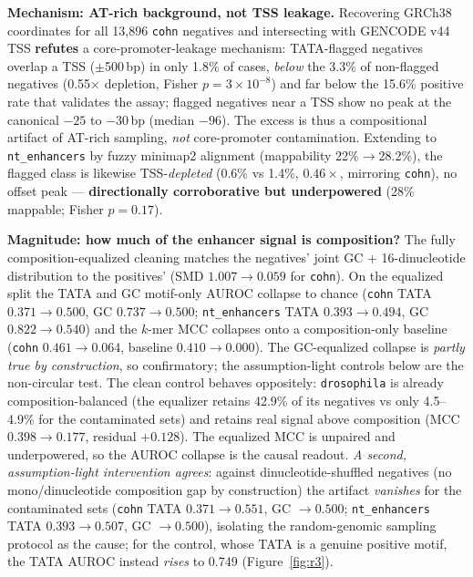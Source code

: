 \documentclass{ws-procs11x85}
\begin{document}
\textbf{Mechanism: AT-rich background, not TSS leakage.} Recovering GRCh38 coordinates for all
13{,}896 \texttt{cohn} negatives and intersecting with GENCODE v44 TSS \textbf{refutes} a
core-promoter-leakage mechanism: TATA-flagged negatives overlap a TSS ($\pm$500\,bp) in only 1.8\% of
cases, \emph{below} the 3.3\% of non-flagged negatives (0.55$\times$ depletion, Fisher
$p{=}3{\times}10^{-8}$) and far below the 15.6\% positive rate that validates the assay; flagged negatives
near a TSS show no peak at the canonical $-25$ to $-30$\,bp (median $-96$). The excess is thus a
compositional artifact of AT-rich sampling, \emph{not} core-promoter contamination. Extending to
\texttt{nt\_enhancers} by fuzzy minimap2 alignment (mappability 22\%$\to$28.2\%), the flagged class is
likewise TSS-\emph{depleted} (0.6\% vs 1.4\%, $0.46\times$, mirroring \texttt{cohn}), no offset peak ---
\textbf{directionally corroborative but underpowered} (28\% mappable; Fisher $p{=}0.17$).

\textbf{Magnitude: how much of the enhancer signal is composition?} The fully composition-equalized
cleaning matches the negatives' joint GC + 16-dinucleotide distribution to the positives' (SMD
$1.007\to0.059$ for \texttt{cohn}). On the equalized split the TATA and GC motif-only AUROC collapse to
chance (\texttt{cohn} TATA $0.371\to0.500$, GC $0.737\to0.500$; \texttt{nt\_enhancers} TATA
$0.393\to0.494$, GC $0.822\to0.540$) and the $k$-mer MCC collapses onto a composition-only baseline
(\texttt{cohn} $0.461\to0.064$, baseline $0.410\to0.000$). The GC-equalized collapse is \emph{partly true
by construction}, so confirmatory; the assumption-light controls below are the non-circular test. The clean control behaves oppositely: \texttt{drosophila} is
already composition-balanced (the equalizer retains 42.9\% of its negatives vs only 4.5--4.9\% for the
contaminated sets) and retains real signal above composition (MCC $0.398\to0.177$, residual $+0.128$).
The equalized MCC is unpaired and underpowered, so the AUROC collapse is the causal readout. \emph{A second, assumption-light intervention
agrees}: against dinucleotide-shuffled negatives (no mono/dinucleotide composition gap by construction)
the artifact \emph{vanishes} for the contaminated sets (\texttt{cohn} TATA $0.371\to0.551$, GC
$\to0.500$; \texttt{nt\_enhancers} TATA $0.393\to0.507$, GC $\to0.500$), isolating the random-genomic
sampling protocol as the cause; for the control, whose TATA is a genuine positive motif, the TATA AUROC
instead \emph{rises} to 0.749 (Figure~\ref{fig:r3}).
\end{document}
